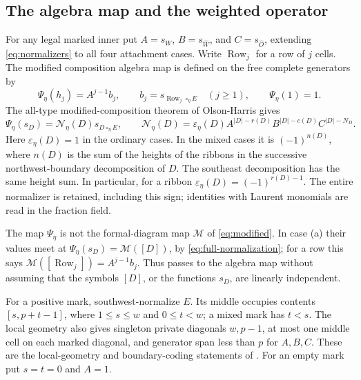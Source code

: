 \documentclass[11pt,a4paper]{amsart}
\numberwithin{equation}{section}
\theoremstyle{plain}
\theoremstyle{definition}
\begin{document}
\subsection{The algebra map and the weighted operator}

For any legal marked inner put \(A=s_W\), \(B=s_{\widehat W}\), and \(C=s_{\widehat O}\), extending \eqref{eq:normalizers} to all four attachment cases.  Write \(\operatorname{Row}_j\) for a row of \(j\) cells.  The modified composition algebra map is defined on the free complete generators by
\begin{equation}\label{eq:algebra-map}
 \Psi_\eta(h_j)=A^{j-1}b_j,\qquad
 b_j=s_{\operatorname{Row}_j\circ_\eta E}\quad(j\ge1),
 \qquad \Psi_\eta(1)=1.
\end{equation}
The all-type modified-composition theorem of Olson-Harris \cite{OlsonHarris2024HopfApplications} gives
\begin{equation}\label{eq:full-normalization}
 \Psi_\eta(s_D)=\mathcal N_\eta(D)s_{D\circ_\eta E},\qquad
 \mathcal N_\eta(D)=\varepsilon_\eta(D)
 A^{|D|-r(D)}B^{|D|-c(D)}C^{|D|-N_D}.
\end{equation}
Here \(\varepsilon_\eta(D)=1\) in the ordinary cases.  In the mixed cases it is \((-1)^{n(D)}\), where \(n(D)\) is the sum of the heights of the ribbons in the successive northwest-boundary decomposition of \(D\).  The southeast decomposition has the same height sum.  In particular, for a ribbon \(\varepsilon_\eta(D)=(-1)^{r(D)-1}\).  The entire normalizer is retained, including this sign; identities with Laurent monomials are read in the fraction field.

The map \(\Psi_\eta\) is not the formal-diagram map \(\mathcal M\) of \eqref{eq:modified}.  In case (a) their values meet at
\(\Psi_\eta(s_D)=\mathcal M([D])\), by \eqref{eq:full-normalization}; for a row this says \(\mathcal M([\operatorname{Row}_j])=A^{j-1}b_j\).  Thus  passes to the algebra map without assuming that the symbols \([D]\), or the functions \(s_D\), are linearly independent.

For a positive mark, southwest-normalize \(E\).  Its middle occupies contents \([s,p+t-1]\), where \(1\le s\le w\) and \(0\le t<w\); a mixed mark has \(t<s\).  The local geometry also gives singleton private diagonals \(w,p-1\), at most one middle cell on each marked diagonal, and generator span less than \(p\) for \(A,B,C\).  These are the local-geometry and boundary-coding statements of \cite{Shields2026Gluing}.  For an empty mark put \(s=t=0\) and \(A=1\).
\end{document}
